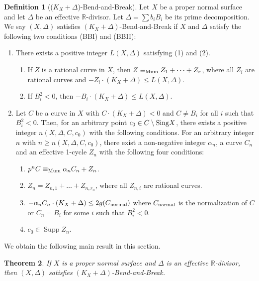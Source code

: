 \documentclass[12pt,twoside]{amsart}
\newcommand{\Supp}[0]{{\operatorname{Supp}}}
\newtheorem{thm}{Theorem}[section]
\theoremstyle{definition}
\newtheorem{dfn}[thm]{Definition}
\begin{document}
\begin{dfn}[($K_X+\Delta$)-Bend-and-Break]\label{deflogbb}
Let $X$ be a proper normal surface and 
let $\Delta$ be an effective $\mathbb{R}$-divisor. 
Let $\Delta=\sum b_iB_i$ be its prime decomposition. 
We say $(X, \Delta)$ satisfies $(K_X+\Delta)$-Bend-and-Break if 
$X$ and $\Delta$ satisfy the following two conditions (BBI) and (BBII):
\begin{enumerate}
\item[(BBI)]{
There exists a positive integer $L(X, \Delta)$ satisfying (1) and (2).
\begin{enumerate}
\item[(1)]{If $Z$ is a rational curve in $X$, then 
$Z \equiv_{\rm Mum} Z_1+ \dots +Z_r$, where 
all $Z_i$ are rational curves 
and $-Z_i\cdot (K_X+\Delta) \leq L(X, \Delta)$.}

\item[(2)]{If $B_i^2<0$, then $-B_i\cdot (K_X+\Delta) \leq L(X, \Delta)$.}
\end{enumerate}
}

\item[(BBII)]{
Let $C$ be a curve in $X$ with 
$C\cdot (K_X+\Delta)<0$ and $C\neq B_i$ for all $i$ such that $B_i^2<0$. 
Then, for an arbitrary point $c_0 \in C \setminus {\rm Sing} X$, 
there exists a positive integer $n(X, \Delta, C, c_0)$ 
with the following conditions. 
For an arbitrary integer $n$ with $n \geq n(X, \Delta, C, c_0)$, 
there exist a non-negative integer $\alpha_n$, a curve $C_n$ 
and an effective 1-cycle $Z_n$ with the following four conditions:
\begin{enumerate}
\item{$p^n C \equiv_{\rm Mum} \alpha_n C_n + Z_n$.}
\item{$Z_n = Z_{n,1} + \dots + Z_{n,r_n}$, where 
all $Z_{n,i}$ are rational curves.}
\item{$-\alpha_nC_n\cdot (K_X+\Delta) \leq 2g(C_{\rm normal})$ where 
$C_{\rm normal}$ is the normalization of $C$ or 
$C_n=B_i$ for some $i$ such that $B_i^2<0$.}
\item{$c_0 \in \Supp Z_n$.}
\end{enumerate}
}
\end{enumerate}
\end{dfn}

We obtain the following main result in this section. 


\begin{thm}\label{theoremlogbb}
If $X$ is a proper normal surface 
and $\Delta$ is an effective $\mathbb{R}$-divisor, 
then $(X, \Delta)$ satisfies $(K_X+\Delta)$-Bend-and-Break.
\end{thm}
\end{document}
